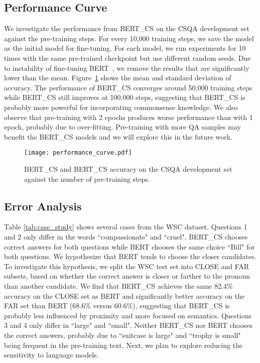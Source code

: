 \documentclass[11pt,a4paper]{article}
\begin{document}
\subsection{Performance Curve}
We investigate the performance from BERT\_CS on the CSQA development set against the pre-training steps.
For every 10,000 training steps, we save the model as the initial model for fine-tuning. 
For each model, we run experiments for 10 times with the same pre-trained checkpoint but use different random seeds.
Due to instability of fine-tuning BERT~\citep{devlin-etal-2019-bert}, we remove the results that are significantly lower than the mean.
Figure~\ref{fig:performance_curve} shows the mean and standard deviation of accuracy. The performance of BERT\_CS converges around 50,000 training steps while BERT\_CS still improves at 100,000 steps, suggesting that BERT\_CS is probably more powerful for incorporating commonsense knowledge.
We also observe that pre-training with 2 epochs produces worse performance than with 1 epoch, probably due to over-fitting.
Pre-training with more QA samples may benefit the BERT\_CS models and we will explore this in the future work.

\begin{figure}[!t]
	\centering
	\texttt{[image: performance\_curve.pdf]}
	\caption{BERT\_CS and BERT\_CS accuracy on the CSQA development set against the number of pre-training steps.}
	\label{fig:performance_curve}
\end{figure}

\subsection{Error Analysis}
Table \ref{tab:case_study} shows several cases from the WSC dataset. 
Questions 1 and 2 only differ in the words ``compassionate" and ``cruel".
BERT\_CS chooses correct answers for both questions while BERT chooses the same choice ``Bill" for both questions. 
We hypothesize that BERT tends to choose the closer candidates. To investigate this hypothesis, we split the WSC test set into CLOSE and FAR subsets, based on whether the correct answer is closer or farther to the pronoun than another candidate.
We find that BERT\_CS achieves the same 82.4\% accuracy on the CLOSE set as BERT and significantly better accuracy on the FAR set than BERT (68.6\% versus 60.6\%), suggesting that BERT\_CS is probably less influenced by proximity and more focused on semantics. Questions 3 and 4 only differ in ``large" and ``small".
Neither BERT\_CS nor BERT chooses the correct answers, probably due to ``suitcase is large" and ``trophy is small" being frequent in the pre-training text. Next, we plan to explore reducing the sensitivity to language models.
\end{document}
